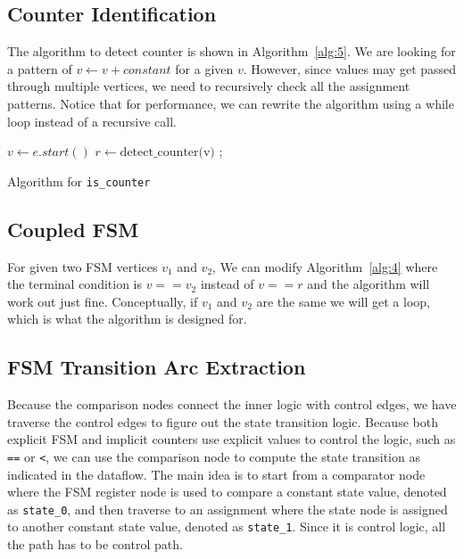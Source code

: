 \documentclass{article}
\begin{document}
\subsection{Counter Identification}
The algorithm to detect counter is shown in Algorithm~\ref{alg:5}. We are looking for a pattern of
$v \gets v + constant$ for a given $v$. However, since values may get passed through multiple
vertices, we need to recursively check all the assignment patterns. Notice that for performance,
we can rewrite the algorithm using a while loop instead of a recursive call.

\begin{algorithm}[htb]
    \label{alg:5}
     {
        $v \gets e.start()$\;
         {
             {
                \;
            }
        }
        $r \gets \text{detect\_counter(v)}$\;
         {
            ;
        }
    }
    \;
 \caption{Algorithm for \texttt{is\_counter}}
\end{algorithm}

\subsection{Coupled FSM}
For given two FSM vertices $v_1$ and $v_2$, We can modify Algorithm~\ref{alg:4} where the
terminal condition is $v == v_2$ instead of $v == r$ and the algorithm will work out just
fine. Conceptually, if $v_1$ and $v_2$ are the same we will get a loop, which is what the
algorithm is designed for.

\subsection{FSM Transition Arc Extraction}
Because the comparison nodes connect the inner logic with control edges, we have traverse
the control edges to figure out the state transition logic. Because both explicit FSM and
implicit counters use explicit values to control the logic, such as \texttt{==} or \texttt{<},
we can use the comparison node to compute the state transition as indicated in the dataflow.
The main idea is to start from a comparator node where the FSM register node is used to compare
a constant state value, denoted as \texttt{state\_0}, and then traverse to an assignment where
the state node is assigned to another constant state value, denoted as \texttt{state\_1}.
Since it is control logic, all the path has to be control path.
\end{document}
